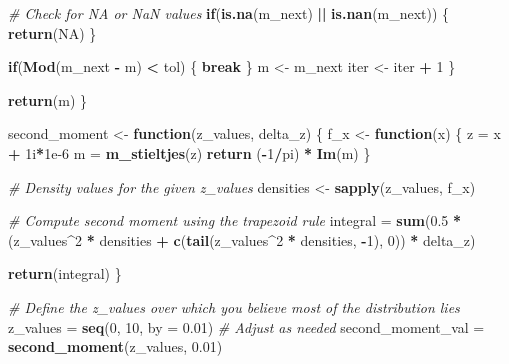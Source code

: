 \documentclass[
]{article}
\newenvironment{Shaded}{\begin{snugshade}}{\end{snugshade}}
\newcommand{\AttributeTok}[1]{\textcolor[rgb]{0.13,0.29,0.53}{#1}}
\newcommand{\CommentTok}[1]{\textcolor[rgb]{0.56,0.35,0.01}{\textit{#1}}}
\newcommand{\ConstantTok}[1]{\textcolor[rgb]{0.56,0.35,0.01}{#1}}
\newcommand{\ControlFlowTok}[1]{\textcolor[rgb]{0.13,0.29,0.53}{\textbf{#1}}}
\newcommand{\DataTypeTok}[1]{\textcolor[rgb]{0.13,0.29,0.53}{#1}}
\newcommand{\DecValTok}[1]{\textcolor[rgb]{0.00,0.00,0.81}{#1}}
\newcommand{\FloatTok}[1]{\textcolor[rgb]{0.00,0.00,0.81}{#1}}
\newcommand{\FunctionTok}[1]{\textcolor[rgb]{0.13,0.29,0.53}{\textbf{#1}}}
\newcommand{\NormalTok}[1]{#1}
\newcommand{\OtherTok}[1]{\textcolor[rgb]{0.56,0.35,0.01}{#1}}
\newcommand{\SpecialCharTok}[1]{\textcolor[rgb]{0.81,0.36,0.00}{\textbf{#1}}}
\begin{document}
\begin{Shaded}
\begin{Highlighting}[]
    \CommentTok{\# Check for NA or NaN values}
    \ControlFlowTok{if}\NormalTok{(}\FunctionTok{is.na}\NormalTok{(m\_next) }\SpecialCharTok{||} \FunctionTok{is.nan}\NormalTok{(m\_next)) \{}
      \FunctionTok{return}\NormalTok{(}\ConstantTok{NA}\NormalTok{)}
\NormalTok{    \}}
    
    \ControlFlowTok{if}\NormalTok{(}\FunctionTok{Mod}\NormalTok{(m\_next }\SpecialCharTok{{-}}\NormalTok{ m) }\SpecialCharTok{\textless{}}\NormalTok{ tol) \{}
      \ControlFlowTok{break}
\NormalTok{    \}}
\NormalTok{    m }\OtherTok{\textless{}{-}}\NormalTok{ m\_next}
\NormalTok{    iter }\OtherTok{\textless{}{-}}\NormalTok{ iter }\SpecialCharTok{+} \DecValTok{1}
\NormalTok{  \}}
  
  \FunctionTok{return}\NormalTok{(m)}
\NormalTok{\}}


\NormalTok{second\_moment }\OtherTok{\textless{}{-}} \ControlFlowTok{function}\NormalTok{(z\_values, delta\_z) \{}
\NormalTok{  f\_x }\OtherTok{\textless{}{-}} \ControlFlowTok{function}\NormalTok{(x) \{}
\NormalTok{    z }\OtherTok{=}\NormalTok{ x }\SpecialCharTok{+} \DecValTok{1}\DataTypeTok{i}\SpecialCharTok{*}\FloatTok{1e{-}6}
\NormalTok{    m }\OtherTok{=} \FunctionTok{m\_stieltjes}\NormalTok{(z)}
    \FunctionTok{return}\NormalTok{ (}\SpecialCharTok{{-}}\DecValTok{1}\SpecialCharTok{/}\NormalTok{pi) }\SpecialCharTok{*} \FunctionTok{Im}\NormalTok{(m)}
\NormalTok{  \}}

  \CommentTok{\# Density values for the given z\_values}
\NormalTok{  densities }\OtherTok{\textless{}{-}} \FunctionTok{sapply}\NormalTok{(z\_values, f\_x)}
  
  \CommentTok{\# Compute second moment using the trapezoid rule}
\NormalTok{  integral }\OtherTok{=} \FunctionTok{sum}\NormalTok{(}\FloatTok{0.5} \SpecialCharTok{*}\NormalTok{ (z\_values}\SpecialCharTok{\^{}}\DecValTok{2} \SpecialCharTok{*}\NormalTok{ densities }\SpecialCharTok{+} \FunctionTok{c}\NormalTok{(}\FunctionTok{tail}\NormalTok{(z\_values}\SpecialCharTok{\^{}}\DecValTok{2} \SpecialCharTok{*}\NormalTok{ densities, }\SpecialCharTok{{-}}\DecValTok{1}\NormalTok{), }\DecValTok{0}\NormalTok{)) }\SpecialCharTok{*}\NormalTok{ delta\_z)}
  
  \FunctionTok{return}\NormalTok{(integral)}
\NormalTok{\}}

\CommentTok{\# Define the z\_values over which you believe most of the distribution lies}
\NormalTok{z\_values }\OtherTok{=} \FunctionTok{seq}\NormalTok{(}\DecValTok{0}\NormalTok{, }\DecValTok{10}\NormalTok{, }\AttributeTok{by =} \FloatTok{0.01}\NormalTok{)  }\CommentTok{\# Adjust as needed}
\NormalTok{second\_moment\_val }\OtherTok{=} \FunctionTok{second\_moment}\NormalTok{(z\_values, }\FloatTok{0.01}\NormalTok{)}
\end{Highlighting}
\end{Shaded}
\end{document}
